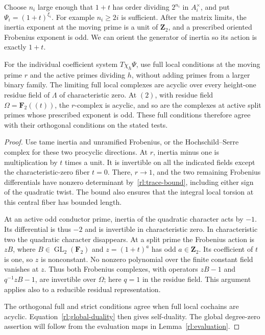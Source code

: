 Choose $n_i$ large enough that $1+t$ has order dividing $2^{n_i}$ in
$A_i^\times$, and put $\Psi_i=(1+t)^{\xi_i}$.  For example $n_i\geq2i$
is sufficient.  After the matrix limits, the inertia exponent at the
moving prime is a unit of $\mathbf Z_2$, and a prescribed oriented
Frobenius exponent is odd.  We can orient the generator of inertia so
its action is exactly $1+t$.

\begin{lemma}\label{rl:local-acyclic}
For the individual coefficient system $T\chi_h\Psi$, use full local
conditions at the moving prime $r$ and the active primes dividing $h$,
without adding primes from a larger binary family.  The limiting full
local complexes are acyclic over every height-one residue field of
$\Lambda$ of characteristic zero.  At $(2)$, with residue field
$\Omega=\mathbf F_2((t))$, the $r$-complex is acyclic, and so are the
complexes at active split primes whose prescribed exponent is odd.
These full conditions therefore agree with their orthogonal conditions
on the stated tests.
\end{lemma}

\begin{proof}
Use tame inertia and unramified Frobenius, or the Hochschild--Serre
complex for these two procyclic directions.  At $r$, inertia minus one
is multiplication by $t$ times a unit.  It is invertible on all the
indicated fields except the characteristic-zero fiber $t=0$.  There,
$r\to1$, and the two remaining Frobenius differentials have nonzero
determinant by~\eqref{rl:trace-bound}, including either sign of the
quadratic twist.  The bound also ensures that the integral local
torsion at this central fiber has bounded length.

At an active odd conductor prime, inertia of the quadratic character
acts by $-1$.  Its differential is thus $-2$ and is invertible in
characteristic zero.  In characteristic two the quadratic character
disappears.  At a split prime the Frobenius action is $zB$, where
$B\in\operatorname{GL}_2(\mathbf F_2)$ and
$z=(1+t)^a$ has odd $a\in\mathbf Z_2$.  Its coefficient of $t$ is one,
so $z$ is nonconstant.  No nonzero polynomial over the finite constant
field vanishes at $z$.  Thus both Frobenius complexes, with operators
$zB-1$ and $q^{-1}zB-1$, are invertible over $\Omega$; here $q=1$ in
the residue field.  This argument applies also to a reducible residual
representation.

The orthogonal full and strict conditions agree when full local cochains
are acyclic.  Equation~\eqref{rl:global-duality} then gives self-duality.
The global degree-zero assertion will follow from the evaluation maps
in Lemma~\ref{rl:evaluation}.
\end{proof}

